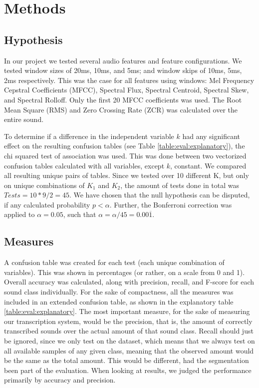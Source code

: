 
\section{Methods}
	\subsection{Hypothesis}
		In our project we tested several audio features and feature configurations.
		We tested window sizes of 20ms, 10ms, and 5ms; and window skips of 10ms, 5ms, 2ms respectively. This was the case for all features using windows: Mel Frequency Cepstral Coefficients (MFCC), Spectral Flux, Spectral Centroid, Spectral Skew, and Spectral Rolloff. Only the first 20 MFCC coefficients was used. The Root Mean Square (RMS) and Zero Crossing Rate (ZCR) was calculated over the entire sound.
		
		To determine if a difference in the independent variable $k$ had any significant effect on the resulting confusion tables (see Table \ref{table:eval:explanatory}), the chi squared test of association was used. This was done between two vectorized confusion tables calculated with all variables, except $k$, constant. We compared all resulting unique pairs of tables. Since we tested over 10 different K, but only on unique combinations of $K_1$ and $K_2$, the amount of tests done in total was $Tests = 10*9/2 = 45$. We have chosen that the null hypothesis can be disputed, if any calculated probability $p < \alpha$. Further, the Bonferroni correction\citep{bonferroni} was applied to $\alpha=0.05$, such that $\alpha=\alpha/45 = 0.00\overline{1}$.
		
	\subsection{Measures}
		A confusion table was created for each test (each unique combination of variables). This was shown in percentages (or rather, on a scale from 0 and 1). Overall accuracy was calculated, along with precision, recall, and F-score for each sound class individually. For the sake of compactness, all the measures was included in an extended confusion table, as shown in the explanatory table \ref{table:eval:explanatory}. 
		The most important measure, for the sake of measuring our transcription system, would be the precision, that is, the amount of correctly transcribed sounds over the actual amount of that sound class.
		Recall should just be ignored, since we only test on the dataset, which means that we always test on all available samples of any given class, meaning that the observed amount would be the same as the total amount. This would be different, had the segmentation been part of the evaluation. When looking at results, we judged the performance primarily by accuracy and precision.

